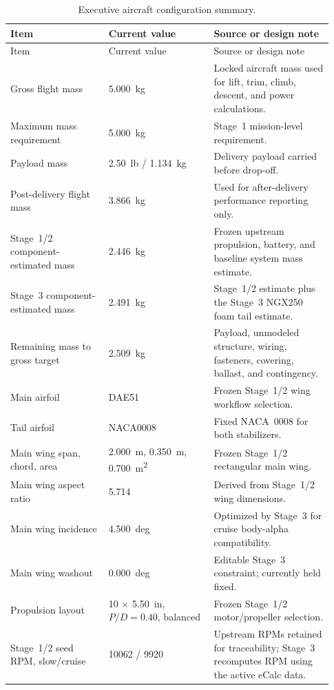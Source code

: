 \documentclass[11pt]{article}
\begin{document}
\begin{longtable}{@{}p{0.29\linewidth}p{0.30\linewidth}p{0.34\linewidth}@{}}
\caption{Executive aircraft configuration summary.}\label{tab:exec-configuration}\\
\toprule
Item & Current value & Source or design note \\
\midrule
\endfirsthead
\toprule
Item & Current value & Source or design note \\
\midrule
\endhead
Gross flight mass & \SI{5.000}{kg} & Locked aircraft mass used for lift, trim, climb, descent, and power calculations. \\
Maximum mass requirement & \SI{5.000}{kg} & Stage~1 mission-level requirement. \\
Payload mass & \SI{2.50}{lb} / \SI{1.134}{kg} & Delivery payload carried before drop-off. \\
Post-delivery flight mass & \SI{3.866}{kg} & Used for after-delivery performance reporting only. \\
Stage~1/2 component-estimated mass & \SI{2.446}{kg} & Frozen upstream propulsion, battery, and baseline system mass estimate. \\
Stage~3 component-estimated mass & \SI{2.491}{kg} & Stage~1/2 estimate plus the Stage~3 NGX250 foam tail estimate. \\
Remaining mass to gross target & \SI{2.509}{kg} & Payload, unmodeled structure, wiring, fasteners, covering, ballast, and contingency. \\
Main airfoil & DAE51 & Frozen Stage~1/2 wing workflow selection. \\
Tail airfoil & NACA0008 & Fixed NACA~0008 for both stabilizers. \\
Main wing span, chord, area & \SI{2.000}{m}, \SI{0.350}{m}, \SI{0.700}{m^2} & Frozen Stage~1/2 rectangular main wing. \\
Main wing aspect ratio & 5.714 & Derived from Stage~1/2 wing dimensions. \\
Main wing incidence & \SI{4.500}{deg} & Optimized by Stage~3 for cruise body-alpha compatibility. \\
Main wing washout & \SI{0.000}{deg} & Editable Stage~3 constraint; currently held fixed. \\
Propulsion layout & 10 \(\times\) \SI{5.50}{in}, \(P/D=0.40\), balanced & Frozen Stage~1/2 motor/propeller selection. \\
Stage~1/2 seed RPM, slow/cruise & \num{10062} / \num{9920} & Upstream RPMs retained for traceability; Stage~3 recomputes RPM using the active eCalc data. \\

\end{longtable}
\end{document}
